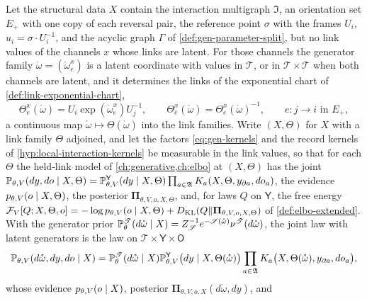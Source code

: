 Let the structural data $X$ contain the interaction multigraph $\mathfrak I$, an orientation set $E_+$ with
one copy of each reversal pair, the reference point $\sigma$ with the frames $U_i$, $u_i=\sigma\cdot
U_i^{-1}$, and the acyclic graph $\Gamma$ of \cref{def:gen-parameter-split}, but no link values of the
channels $x$ whose links are latent. For those channels the generator family
$\mathring\omega=(\mathring\omega^x_e)$ is a latent coordinate with values in $\mathscr T$, or in
$\mathscr T\times\mathscr T$ when both channels are latent, and it determines the links of the exponential
chart of
\cref{def:link-exponential-chart},
\begin{equation}
\Theta^x_e(\mathring\omega)=U_i\exp(\mathring\omega^x_e)U_j^{-1},
\qquad
\Theta^x_{\bar e}(\mathring\omega)=\Theta^x_e(\mathring\omega)^{-1},
\qquad e:j\to i\text{ in }E_+,
\label{eq:link-generator-links}
\end{equation}
a continuous map $\mathring\omega\mapsto\Theta(\mathring\omega)$ into the link families. Write $(X,\Theta)$ for
$X$ with a link family $\Theta$ adjoined, and let the factors \eqref{eq:gen-kernels} and the record kernels
of \cref{hyp:local-interaction-kernels} be measurable in the link values, so that for each $\Theta$ the
held-link model of \cref{ch:generative,ch:elbo} at $(X,\Theta)$ has the joint
$\mathbb P_{\theta,V}(dy,do\mid X,\Theta)=\mathbb P^{\mathsf Y}_{\theta,V}(dy\mid X,\Theta)\prod_{a\in\mathfrak A}K_a(X,\Theta,y_{\partial a},do_a)$,
the evidence $p_{\theta,V}(o\mid X,\Theta)$, the posterior $\boldsymbol\Pi_{\theta,V,o,X,\Theta}$, and, for
laws $Q$ on $\mathsf Y$, the free energy
$\mathcal F_V[Q;X,\Theta,o]=-\log p_{\theta,V}(o\mid X,\Theta)+D_{\mathrm{KL}}(Q\Vert\boldsymbol\Pi_{\theta,V,o,X,\Theta})$ of
\cref{def:elbo-extended}. With the generator prior
$\mathbb P^{\mathscr T}_\theta(d\mathring\omega\mid X)=Z_{\mathscr S}^{-1}e^{-\mathscr S(\mathring\omega)}\nu^{\mathscr T}(d\mathring\omega)$,
the joint law with latent generators is the law on $\mathscr T\times\mathsf Y\times\mathsf O$
\begin{equation}
\mathbb P_{\theta,V}(d\mathring\omega,dy,do\mid X)
=\mathbb P^{\mathscr T}_\theta(d\mathring\omega\mid X)
\mathbb P^{\mathsf Y}_{\theta,V}\bigl(dy\mid X,\Theta(\mathring\omega)\bigr)
\prod_{a\in\mathfrak A}K_a\bigl(X,\Theta(\mathring\omega),y_{\partial a},do_a\bigr),
\label{eq:link-latent-joint}
\end{equation}
whose evidence $p_{\theta,V}(o\mid X)$, posterior $\boldsymbol\Pi_{\theta,V,o,X}(d\mathring\omega,dy)$, and
